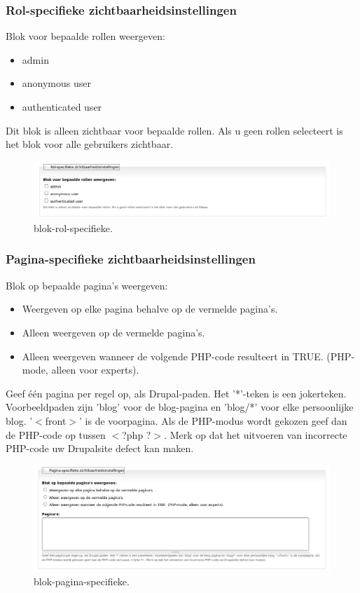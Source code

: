 \subsubsection{Rol-specifieke zichtbaarheidsinstellingen}
Blok voor bepaalde rollen weergeven:  
\begin{itemize}
\item admin
\item anonymous user
\item authenticated user
\end{itemize}
Dit blok is alleen zichtbaar voor bepaalde rollen. Als u geen rollen selecteert is het blok voor alle gebruikers zichtbaar.
\begin{figure}[!h]
    \centering
   \includegraphics[scale=0.3,angle=0]{blok-rol-specifieke}
   \caption{blok-rol-specifieke.\label{white}}
 \end{figure} 
\subsubsection{Pagina-specifieke zichtbaarheidsinstellingen}
Blok op bepaalde pagina's weergeven:   
\begin{itemize}
\item Weergeven op elke pagina behalve op de vermelde pagina's.
\item Alleen weergeven op de vermelde pagina's.
\item Alleen weergeven wanneer de volgende PHP-code resulteert in TRUE. (PHP-mode, alleen voor experts).
\end{itemize}
Geef \'e\'en pagina per regel op, als Drupal-paden. Het '*'-teken is een
jokerteken. Voorbeeldpaden zijn 'blog' voor de blog-pagina en 'blog/*' voor elke
persoonlijke blog. '$<$front$>$' is de voorpagina. Als de PHP-modus wordt
gekozen geef dan de PHP-code op tussen $<$?php ?$>$. Merk op dat het uitvoeren
van incorrecte PHP-code uw Drupalsite defect kan maken. 
\begin{figure}[!h]
    \centering
   \includegraphics[scale=0.3,angle=0]{blok-pagina-specifieke}
   \caption{blok-pagina-specifieke.\label{white}}
 \end{figure} 




